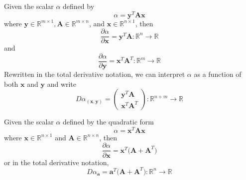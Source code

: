   \begin{theorem}
  Given the scalar $\alpha$ defined by 
  \[\alpha = \mathbf{y}^T \mathbf{A} \mathbf{x}\]
  where $\mathbf{y} \in \mathbb{R}^{m \times 1}, \mathbf{A} \in \mathbb{R}^{m \times n}$, and $\mathbf{x} \in \mathbb{R}^{n \times 1}$, then 
  \[\frac{\partial \alpha}{\partial \mathbf{x}} = \mathbf{y}^T \mathbf{A} : \mathbb{R}^n \longrightarrow \mathbb{R}\]
  and 
  \[\frac{\partial \alpha}{\partial \mathbf{y}} = \mathbf{x}^T \mathbf{A}^T : \mathbb{R}^m \longrightarrow \mathbb{R}\]
  Rewritten in the total derivative notation, we can interpret $\alpha$ as a function of both $\mathbf{x}$ and $\mathbf{y}$ and write 
  \[D \alpha_{(\mathbf{x}, \mathbf{y})} = \begin{pmatrix} \mathbf{y}^T \mathbf{A} \\ \mathbf{x}^T \mathbf{A}^T \end{pmatrix} : \mathbb{R}^{n + m} \longrightarrow \mathbb{R}\]
  \end{theorem}

  \begin{theorem}
  Given the scalar $\alpha$ defined by the quadratic form 
  \[\alpha = \mathbf{x}^T \mathbf{A} \mathbf{x}\]
  where $\mathbf{x} \in \mathbb{R}^{n \times 1}$ and $\mathbf{A} \in \mathbb{R}^{n \times n}$, then 
  \[\frac{\partial \alpha}{\partial \mathbf{x}} = \mathbf{x}^T \big( \mathbf{A} + \mathbf{A}^T \big)\]
  or in the total derivative notation, 
  \[D \alpha_\mathbf{a} = \mathbf{a}^T \big( \mathbf{A} + \mathbf{A}^T \big) : \mathbb{R}^n \longrightarrow \mathbb{R}\]
  \end{theorem}

